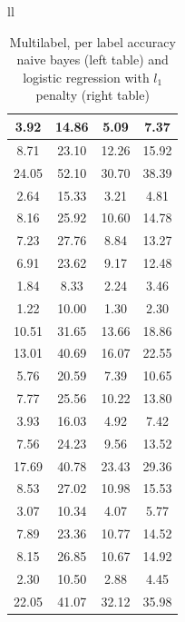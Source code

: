 \documentclass{article} %
\begin{document}
\begin{table}[h]
\begin{center}
\begin{tabular}{ll}
\begin{tabular}{|c|c|c|c|}
 3.92	& 14.86	& 5.09	& 7.37	\\ \hline 
 8.71	& 23.10	& 12.26	& 15.92	\\ \hline 
 24.05	& 52.10	& 30.70	& 38.39	\\ \hline 
 2.64	& 15.33	& 3.21	& 4.81	\\ \hline 
 8.16	& 25.92	& 10.60	& 14.78	\\ \hline 
 7.23	& 27.76	& 8.84	& 13.27	\\ \hline 
 6.91	& 23.62	& 9.17	& 12.48	\\ \hline 
 1.84	& 8.33	& 2.24	& 3.46	\\ \hline 
 1.22	& 10.00	& 1.30	& 2.30	\\ \hline 
 10.51	& 31.65	& 13.66	& 18.86	\\ \hline 
 13.01	& 40.69	& 16.07	& 22.55	\\ \hline 
 5.76	& 20.59	& 7.39	& 10.65	\\ \hline 
 7.77	& 25.56	& 10.22	& 13.80	\\ \hline 
 3.93	& 16.03	& 4.92	& 7.42	\\ \hline 
 7.56	& 24.23	& 9.56	& 13.52	\\ \hline 
 17.69	& 40.78	& 23.43	& 29.36	\\ \hline 
 8.53	& 27.02	& 10.98	& 15.53	\\ \hline 
 3.07	& 10.34	& 4.07	& 5.77	\\ \hline 
 7.89	& 23.36	& 10.77	& 14.52	\\ \hline 
 8.15	& 26.85	& 10.67	& 14.92	\\ \hline 
 2.30	& 10.50	& 2.88	& 4.45	\\ \hline 
 22.05	& 41.07	& 32.12	& 35.98	\\ \hline 
\end{tabular}
\end{tabular}
\caption{Multilabel, per label accuracy naive bayes (left table) and logistic regression with $l_1$ penalty (right table)}
\end{center}
\end{table}
\end{document}
